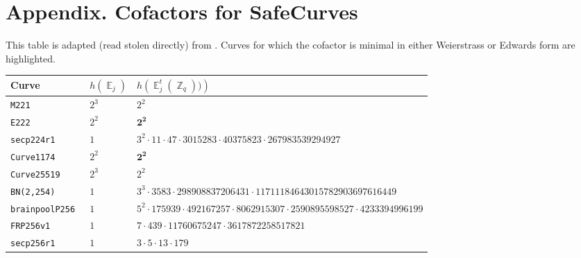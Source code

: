 \documentclass[11pt,fleqn]{article}
\newcommand{\Ejt}{\ensuremath{\BbbE^t_j(\BbbZ_q))} }
\newcommand{\Ej}{\ensuremath{\BbbE_j} }
\begin{document}
\section*{Appendix. Cofactors for SafeCurves}

This table is adapted (read stolen directly) from \cite{safecurves}.
Curves for which the cofactor is minimal in either Weierstrass or
Edwards form are highlighted.


%
\begin{tabularx}{\textwidth}{llR}
\textbf{Curve}            &$h(\Ej)$ & $h(\Ejt)$ \\
\hline
\texttt{\footnotesize M221         }& $\scriptstyle 2^3$    & $\scriptstyle 2^2                                                                  $\\
\texttt{\footnotesize E222         }& $\scriptstyle 2^2$    & $\scriptstyle \mathbf{2^2}                                                                  $\\
\texttt{\footnotesize secp224r1     }& $\scriptstyle 1  $    & $\scriptstyle 3^2 \cdot 11 \cdot 47 \cdot 3015283 \cdot 40375823 \cdot 267983539294927                 $\\
\texttt{\footnotesize Curve1174     }& $\scriptstyle 2^2$    & $\scriptstyle \mathbf{2^2}                                                                  $\\
\texttt{\footnotesize Curve25519    }& $\scriptstyle 2^3$    & $\scriptstyle 2^2                                                                  $\\
\texttt{\footnotesize BN(2,254)     }& $\scriptstyle 1  $    & $\scriptstyle 3^3 \cdot 3583 \cdot 298908837206431 \cdot 11711184643015782903697616449         $\\
\texttt{\footnotesize brainpoolP256 }& $\scriptstyle 1  $    & $\scriptstyle 5^2 \cdot 175939 \cdot 492167257 \cdot 8062915307 \cdot 2590895598527 \cdot 4233394996199$\\
\texttt{\footnotesize FRP256v1      }& $\scriptstyle 1  $    & $\scriptstyle 7 \cdot 439 \cdot 11760675247 \cdot 3617872258517821                             $\\
\texttt{\footnotesize secp256r1     }& $\scriptstyle 1  $    & $\scriptstyle 3 \cdot 5 \cdot 13 \cdot 179                                                     $\\

\end{tabularx}
\end{document}
